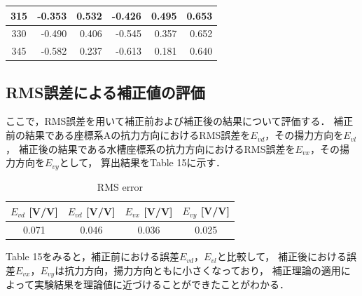 \begin{table}[htbp]
\begin{center}
\begin{tabular}{|p{20mm}|p{20mm}|p{20mm}|p{20mm}|p{20mm}|p{20mm}|}
      \multicolumn{1}{|c|}{315}                     & \multicolumn{1}{|r|}{-0.353}               & \multicolumn{1}{|r|}{0.532}                & \multicolumn{1}{|r|}{-0.426}               & \multicolumn{1}{|r|}{0.495}                & \multicolumn{1}{|r|}{0.653}                    \\ \hline
      \multicolumn{1}{|c|}{330}                     & \multicolumn{1}{|r|}{-0.490}               & \multicolumn{1}{|r|}{0.406}                & \multicolumn{1}{|r|}{-0.545}               & \multicolumn{1}{|r|}{0.357}                & \multicolumn{1}{|r|}{0.652}                    \\ \hline
      \multicolumn{1}{|c|}{345}                     & \multicolumn{1}{|r|}{-0.582}               & \multicolumn{1}{|r|}{0.237}                & \multicolumn{1}{|r|}{-0.613}               & \multicolumn{1}{|r|}{0.181}                & \multicolumn{1}{|r|}{0.640}                    \\ \hline
    \end{tabular}
  \end{center}
\end{table}

\newpage

\subsection{RMS誤差による補正値の評価}

ここで，RMS誤差を用いて補正前および補正後の結果について評価する．
補正前の結果である座標系Aの抗力方向におけるRMS誤差を$E_{vd}$，その揚力方向を$E_{vl}$，
補正後の結果である水槽座標系の抗力方向におけるRMS誤差を$E_{vx}$，その揚力方向を$E_{vy}$として，
算出結果をTable 15に示す．

\begin{table}[htbp]
  \begin{center}
    \caption{RMS error}
    \begin{tabular}{|p{20mm}|p{20mm}p{20mm}|p{20mm}|}
      \hline
      \multicolumn{1}{|c|}{$E_{vd}$ [V/V]} & \multicolumn{1}{|c|}{$E_{vd}$ [V/V]} & \multicolumn{1}{|c|}{$E_{vx}$ [V/V]} & \multicolumn{1}{|c|}{$E_{vy}$ [V/V]} \\ \hline
      \multicolumn{1}{|c|}{0.071}          & \multicolumn{1}{|c|}{0.046}          & \multicolumn{1}{|c|}{0.036}          & \multicolumn{1}{|c|}{0.025}          \\ \hline
    \end{tabular}
  \end{center}
\end{table}

Table 15をみると，補正前における誤差$E_{vd}$，$E_{vl}$と比較して，
補正後における誤差$E_{vx}$，$E_{vy}$は抗力方向，揚力方向ともに小さくなっており，
補正理論の適用によって実験結果を理論値に近づけることができたことがわかる．